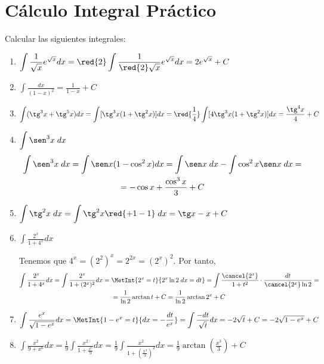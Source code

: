 \section{Cálculo Integral Práctico}

\renewcommand{\labelenumi}{\alph{enumi})}
\begin{ejercicio}\label{Ejercicio.Ej1}
Calcular las siguientes integrales:
\begin{enumerate}
    \item $\displaystyle \int \frac{1}{\sqrt{x}}e^{\sqrt{x}}dx = \red{2}\int \frac{1}{\red{2}\sqrt{x}}e^{\sqrt{x}}dx = 2e^{\sqrt{x}} +C$

    \item $\displaystyle \int \frac{dx}{(1-x)^2} = \frac{1}{1-x} +C$

    \item $\displaystyle \int (\tg^3x + \tg^5x) dx
    = \int [\tg^3x(1+\tg^2x)]dx
    = \red{\frac{1}{4}}\int [4\tg^3x(1+\tg^2x)]dx = \frac{\tg^4x}{4} +C$

    \item $\displaystyle \int \sen^3 x\; dx$
    \begin{multline*}
        \int \sen^3 x\; dx
        = \int \sen x (1-\cos^2 x)dx
        = \int \sen x\;dx -\int \cos^2x\sen x\;dx =\\= -\cos x +\frac{\cos^3x}{3}+C
    \end{multline*}

    \item $\displaystyle \int \tg^2x\;dx = \int \tg^2x \red{+1-1}\;dx = \tg x -x + C$

    \item $\displaystyle \int \frac{2^x}{1+4^x}dx$

    Tenemos que $4^x = (2^2)^x = 2^{2x} = (2^x)^2$. Por tanto,
    \begin{multline*}
        \int \frac{2^x}{1+4^x}dx
        = \int \frac{2^x}{1+(2^x)^2}dx
        = \MetInt{2^x=t}{2^x\ln 2\;dx = dt}
        =\int \frac{\cancel{2^x}}{1+t^2}\cdot \frac{dt}{\cancel{2^x}\ln 2}
        =\\= \frac{1}{\ln 2}\arctan t + C
        = \frac{1}{\ln 2}\arctan 2^x + C
    \end{multline*}

    \item $\displaystyle \int \frac{e^x}{\sqrt{1-e^x}}dx = \MetInt{1-e^x = t}{dx = -\frac{dt}{e^x}}
    = \int \frac{-dt}{\sqrt{t}}dx = -2\sqrt{t} +C = -2\sqrt{1-e^x}+C$

    \item $\displaystyle \int \frac{x^2}{9+x^6}dx = \frac{1}{9}\int \frac{x^2}{1+\frac{x^6}{9}}dx = \frac{1}{9} \int \frac{x^2}{1+\left(\frac{x^3}{3}\right)^2} dx
    = \frac{1}{9} \arctan \left(\frac{x^3}{3}\right) +C$


\end{enumerate}
\end{ejercicio}
